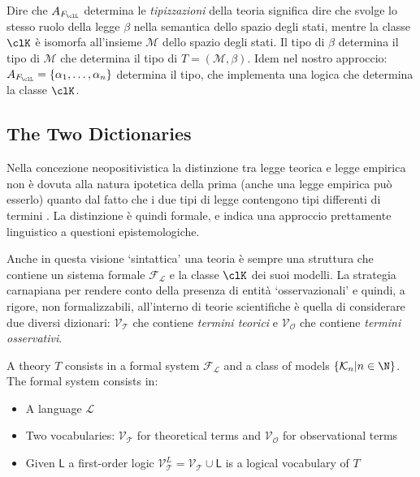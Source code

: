Dire che $A_{F_\clL}$ determina le \emph{tipizzazioni} della teoria significa
dire che svolge lo stesso ruolo della legge $\beta$ nella semantica dello spazio degli
stati, mentre la classe $\clK$ è isomorfa all'insieme $\mathcal{M}$ dello spazio
degli stati. Il tipo di $\beta$ determina il tipo di $\mathcal{M}$ che determina il
tipo di $T = (\mathcal{M}, \beta)$. Idem nel nostro approccio: $A_{F_\clL}
	= \{\alpha_1,\dots,\alpha_n\}$ determina il tipo, che implementa una logica che determina
la classe $\clK$.

\subsection{The Two Dictionaries}
Nella concezione neopositivistica la distinzione tra legge teorica e legge empirica non è dovuta alla natura ipotetica della prima (anche una legge empirica può esserlo) quanto dal fatto che i due tipi di legge contengono tipi differenti di termini \cite{?}. La distinzione è quindi formale, e indica una approccio prettamente linguistico a questioni epistemologiche.
\begin{remark}\label{hint_at_collage}
	Anche in questa visione `sintattica' \cite{giunti2016} una teoria è sempre una struttura che contiene un sistema formale $\mathcal{F_L}$ e la classe $\clK$ dei suoi modelli. La strategia carnapiana per rendere conto della presenza di entità `osservazionali' e quindi, a rigore, non formalizzabili, all'interno di teorie scientifiche è quella di considerare due diversi dizionari: $\mathcal{V_T}$ che contiene \emph{termini teorici} e $\mathcal{V_O}$ che contiene \emph{termini osservativi}. 
\end{remark}


\begin{definition} 
	A theory $T$ consists in a formal system $\mathcal{F_L}$ and a class of models $\{\mathcal{K}_n | n \in \N \}$. The formal system consists in:
	\begin{itemize}
		\item A language $\mathcal{L}$
		\item Two vocabularies: $\mathcal{V_T}$ for theoretical terms and $\mathcal{V_O}$ for observational terms 
		\item Given $\mathsf{L}$ a first-order logic $\mathcal{V}_{\mathcal{T}}^L = \mathcal{V_T} \cup \mathsf{L}$ is a logical vocabulary of $T$
	\end{itemize}    
\end{definition}

